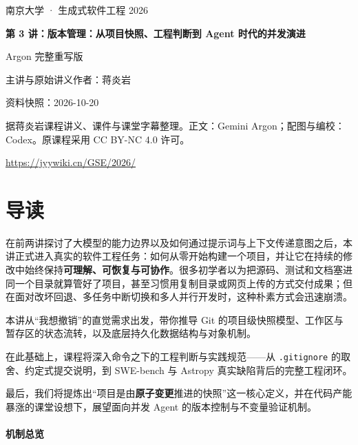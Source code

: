 \documentclass[UTF8,a4paper,11pt,fontset=fandol]{ctexart}
\begin{document}
\begin{titlepage}\centering\vspace*{25mm}

{\Large 南京大学 · 生成式软件工程 2026\par}\vspace{12mm}

{\Huge\bfseries 第 3 讲：版本管理：从项目快照、工程判断到 Agent 时代的并发演进\par}\vspace{10mm}

{\Large Argon 完整重写版\par}\vspace{10mm}

主讲与原始讲义作者：蒋炎岩\par

资料快照：2026-10-20\par\vfill

据蒋炎岩课程讲义、课件与课堂字幕整理。正文：Gemini Argon；配图与编校：Codex。原课程采用 CC BY-NC 4.0 许可。

\vspace{8mm}\url{https://jyywiki.cn/GSE/2026/}

\end{titlepage}

\tableofcontents\clearpage

\section*{导读}

在前两讲探讨了大模型的能力边界以及如何通过提示词与上下文传递意图之后，本讲正式进入真实的软件工程任务：如何从零开始构建一个项目，并让它在持续的修改中始终保持\textbf{可理解、可恢复与可协作}。很多初学者以为把源码、测试和文档塞进同一个目录就算管好了项目，甚至习惯用复制目录或网页上传的方式交付成果；但在面对改坏回退、多任务中断切换和多人并行开发时，这种朴素方式会迅速崩溃。

本讲从“我想撤销”的直觉需求出发，带你推导 Git 的项目级快照模型、工作区与暂存区的状态流转，以及底层持久化数据结构与对象机制。

在此基础上，课程将深入命令之下的工程判断与实践规范——从 \texttt{.gitignore} 的取舍、约定式提交说明，到 SWE-bench 与 Astropy 真实缺陷背后的完整工程闭环。

最后，我们将提炼出“项目是由\textbf{原子变更}推进的快照”这一核心定义，并在代码产能暴涨的课堂设想下，展望面向并发 Agent 的版本控制与不变量验证机制。

\paragraph{机制总览}
\end{document}
